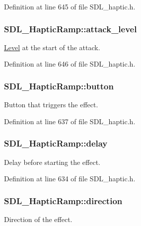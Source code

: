 Definition at line 645 of file S\-D\-L\-\_\-haptic.\-h.

\hypertarget{struct_s_d_l___haptic_ramp_a755933bbda14ae9b53c574b9fe6291a0}{
\subsubsection[{attack\-\_\-level}]{ S\-D\-L\-\_\-\-Haptic\-Ramp\-::attack\-\_\-level}}\label{struct_s_d_l___haptic_ramp_a755933bbda14ae9b53c574b9fe6291a0}
\hyperlink{class_level}{Level} at the start of the attack. 

Definition at line 646 of file S\-D\-L\-\_\-haptic.\-h.

\hypertarget{struct_s_d_l___haptic_ramp_a2027c6fd88f1ebe652c90c71410ee0bf}{
\subsubsection[{button}]{ S\-D\-L\-\_\-\-Haptic\-Ramp\-::button}}\label{struct_s_d_l___haptic_ramp_a2027c6fd88f1ebe652c90c71410ee0bf}
Button that triggers the effect. 

Definition at line 637 of file S\-D\-L\-\_\-haptic.\-h.

\hypertarget{struct_s_d_l___haptic_ramp_ac9471016f41919b4a1c786bbd649a777}{
\subsubsection[{delay}]{ S\-D\-L\-\_\-\-Haptic\-Ramp\-::delay}}\label{struct_s_d_l___haptic_ramp_ac9471016f41919b4a1c786bbd649a777}
Delay before starting the effect. 

Definition at line 634 of file S\-D\-L\-\_\-haptic.\-h.

\hypertarget{struct_s_d_l___haptic_ramp_a6fb6c67ccf262b8f3ec08bcdf08f9965}{
\subsubsection[{direction}]{ S\-D\-L\-\_\-\-Haptic\-Ramp\-::direction}}\label{struct_s_d_l___haptic_ramp_a6fb6c67ccf262b8f3ec08bcdf08f9965}
Direction of the effect. 


